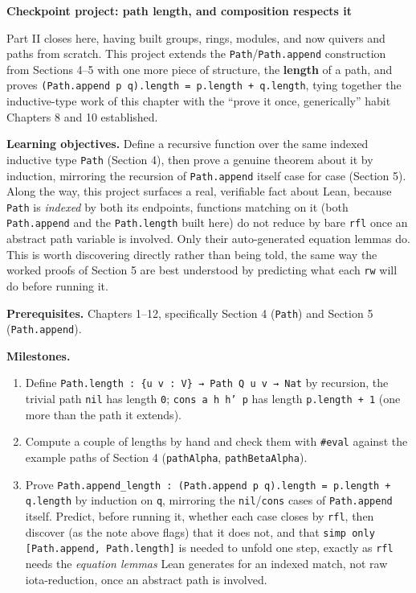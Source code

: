 \begin{pblproject}
\label{sec:12-path-algebras:07-checkpoint-project:1}
\textbf{\large Checkpoint project: path length, and composition respects it}\par\smallskip


Part II closes here, having built groups, rings, modules, and now quivers and paths from scratch. This project extends the \texttt{Path}/\texttt{Path.append} construction from Sections 4--5 with one more piece of structure, the \textbf{length} of a path, and proves \texttt{(Path.append p q).length = p.length + q.length}, tying together the inductive-type work of this chapter with the ``prove it once, generically'' habit Chapters 8 and 10 established.

\textbf{Learning objectives.} Define a recursive function over the same indexed inductive type \texttt{Path} (Section 4), then prove a genuine theorem about it by induction, mirroring the recursion of \texttt{Path.append} itself case for case (Section 5). Along the way, this project surfaces a real, verifiable fact about Lean, because \texttt{Path} is \emph{indexed} by both its endpoints, functions matching on it (both \texttt{Path.append} and the \texttt{Path.length} built here) do not reduce by bare \texttt{rfl} once an abstract path variable is involved. Only their auto-generated equation lemmas do. This is worth discovering directly rather than being told, the same way the worked proofs of Section 5 are best understood by predicting what each \texttt{rw} will do before running it.

\textbf{Prerequisites.} Chapters 1--12, specifically Section 4 (\texttt{Path}) and Section 5 (\texttt{Path.append}).

\textbf{Milestones.}

\begin{enumerate}
\def\labelenumi{\arabic{enumi}.}
\tightlist
\item
  Define \texttt{Path.length : \{u v : V\} → Path Q u v → Nat} by recursion, the trivial path \texttt{nil} has length \texttt{0}; \texttt{cons a h h' p} has length \texttt{p.length + 1} (one more than the path it extends).
\item
  Compute a couple of lengths by hand and check them with \texttt{\#eval} against the example paths of Section 4 (\texttt{pathAlpha}, \texttt{pathBetaAlpha}).
\item
  Prove \texttt{Path.append\_\allowbreak{}length : (Path.append p q).length = p.length + q.length} by induction on \texttt{q}, mirroring the \texttt{nil}/\texttt{cons} cases of \texttt{Path.append} itself. Predict, before running it, whether each case closes by \texttt{rfl}, then discover (as the note above flags) that it does not, and that \texttt{simp only [Path.append, Path.length]} is needed to unfold one step, exactly as \texttt{rfl} needs the \emph{equation lemmas} Lean generates for an indexed match, not raw iota-reduction, once an abstract path is involved.
\end{enumerate}


\end{pblproject}
